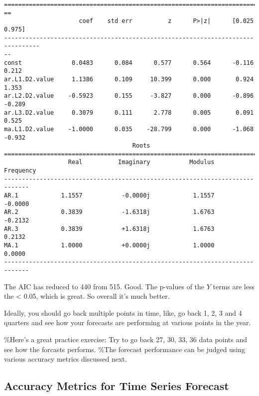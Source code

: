 \begin{tcolorbox}[breakable, size=fbox, boxrule=1pt, pad at break*=1mm,colback=cellbackground, colframe=cellborder]
\begin{Verbatim}[commandchars=\\\{\}]
================================================================================
==
                     coef    std err          z      P>|z|      [0.025
0.975]
--------------------------------------------------------------------------------
--
const              0.0483      0.084      0.577      0.564      -0.116
0.212
ar.L1.D2.value     1.1386      0.109     10.399      0.000       0.924
1.353
ar.L2.D2.value    -0.5923      0.155     -3.827      0.000      -0.896
-0.289
ar.L3.D2.value     0.3079      0.111      2.778      0.005       0.091
0.525
ma.L1.D2.value    -1.0000      0.035    -28.799      0.000      -1.068
-0.932
                                    Roots
=============================================================================
                  Real          Imaginary           Modulus         Frequency
-----------------------------------------------------------------------------
AR.1            1.1557           -0.0000j            1.1557           -0.0000
AR.2            0.3839           -1.6318j            1.6763           -0.2132
AR.3            0.3839           +1.6318j            1.6763            0.2132
MA.1            1.0000           +0.0000j            1.0000            0.0000
-----------------------------------------------------------------------------
\end{Verbatim}
\end{tcolorbox}

\begin{center}
\end{center}
    
The AIC has reduced to 440 from 515. Good. The p-values of the \(Y\)
terms are less the \textless{} 0.05, which is great. So overall it's
much better.

Ideally, you should go back multiple points in time, like, go back 1, 2,
3 and 4 quarters and see how your forecasts are performing at various
points in the year.

\%Here's a great practice exercise: Try to go back 27, 30, 33, 36 data
points and see how the forcasts performs. \%The forecast performance can
be judged using various accuracy metrics discussed next.

\subsection{Accuracy Metrics for Time Series
Forecast}\label{accuracy-metrics-for-time-series-forecast}

